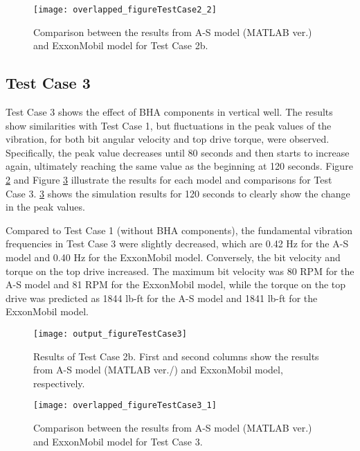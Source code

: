 \begin{figure}
  \centering
  \texttt{[image: overlapped\_figureTestCase2\_2]}
  \caption[Comparison of the results for Test Case 2b]{Comparison between the results from A-S model (MATLAB ver.) and ExxonMobil model for Test Case 2b.}\label{figure_testcase2_2_overlapped}
\end{figure}

\subsection{Test Case 3}
Test Case 3 shows the effect of BHA components in vertical well. The results show similarities with Test Case 1, but fluctuations in the peak values of the vibration, for both bit angular velocity and top drive torque, were observed. Specifically, the peak value decreases until 80 seconds and then starts to increase again, ultimately reaching the same value as the beginning at 120 seconds. Figure \ref{figure_testcase3} and Figure \ref{figure_testcase3_overlapped} illustrate the results for each model and comparisons for Test Case 3. \ref{figure_testcase3_overlapped} shows the simulation results for 120 seconds to clearly show the change in the peak values.

Compared to Test Case 1 (without BHA components), the fundamental vibration frequencies in Test Case 3 were slightly decreased, which are 0.42 Hz for the A-S model and 0.40 Hz for the ExxonMobil model. Conversely, the bit velocity and torque on the top drive increased. The maximum bit velocity was 80 RPM for the A-S model and 81 RPM for the ExxonMobil model, while the torque on the top drive was predicted as 1844 lb-ft for the A-S model and 1841 lb-ft for the ExxonMobil model. 

\begin{figure}
  \centering
  \texttt{[image: output\_figureTestCase3]}
  \caption[Results of Test Case 3]{Results of Test Case 2b. First and second columns show the results from A-S model (MATLAB ver./) and ExxonMobil model, respectively.}\label{figure_testcase3}
\end{figure}
\begin{figure}
  \centering
  \texttt{[image: overlapped\_figureTestCase3\_1]}
  \caption[Comparison of the results for Test Case 3]{Comparison between the results from A-S model (MATLAB ver.) and ExxonMobil model for Test Case 3.}\label{figure_testcase3_overlapped}
\end{figure}

